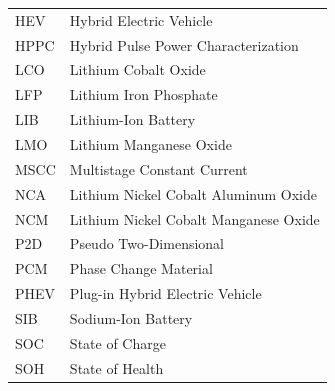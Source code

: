 \documentclass{thesis}
\begin{document}
\begin{tabular}{ l l }
    \hspace{1cm} HEV & \hspace{4cm} Hybrid Electric Vehicle \\
    \hspace{1cm} HPPC & \hspace{4cm} Hybrid Pulse Power Characterization \\
    \hspace{1cm} LCO & \hspace{4cm} Lithium Cobalt Oxide \\
    \hspace{1cm} LFP & \hspace{4cm} Lithium Iron Phosphate \\
    \hspace{1cm} LIB & \hspace{4cm} Lithium-Ion Battery \\
    \hspace{1cm} LMO & \hspace{4cm} Lithium Manganese Oxide \\
    \hspace{1cm} MSCC & \hspace{4cm} Multistage Constant Current \\
    \hspace{1cm} NCA & \hspace{4cm} Lithium Nickel Cobalt Aluminum Oxide \\
    \hspace{1cm} NCM & \hspace{4cm} Lithium Nickel Cobalt Manganese Oxide \\
    \hspace{1cm} P2D & \hspace{4cm} Pseudo Two-Dimensional \\
    \hspace{1cm} PCM & \hspace{4cm} Phase Change Material \\
    \hspace{1cm} PHEV & \hspace{4cm} Plug-in Hybrid Electric Vehicle \\
    \hspace{1cm} SIB & \hspace{4cm} Sodium-Ion Battery \\
    \hspace{1cm} SOC & \hspace{4cm} State of Charge \\
    \hspace{1cm} SOH & \hspace{4cm} State of Health \\

\end{tabular}
\end{document}
